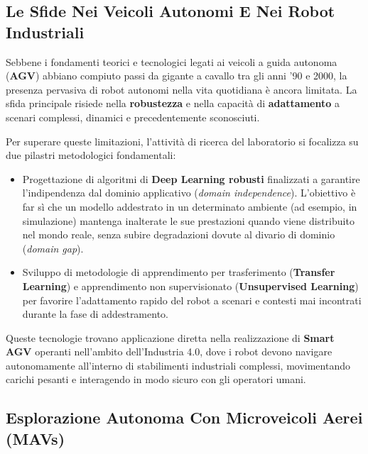﻿\documentclass[11pt, a4paper]{article}
\begin{document}
\subsection{Le Sfide Nei Veicoli Autonomi E Nei Robot Industriali}

Sebbene i fondamenti teorici e tecnologici legati ai veicoli a guida autonoma (\textbf{AGV}) abbiano compiuto passi da gigante a cavallo tra gli anni '90 e 2000, la presenza pervasiva di robot autonomi nella vita quotidiana è ancora limitata. La sfida principale risiede nella \textbf{robustezza} e nella capacità di \textbf{adattamento} a scenari complessi, dinamici e precedentemente sconosciuti.

Per superare queste limitazioni, l'attività di ricerca del laboratorio si focalizza su due pilastri metodologici fondamentali:
\begin{itemize}[noitemsep]
    \item Progettazione di algoritmi di \textbf{Deep Learning robusti} finalizzati a garantire l'indipendenza dal dominio applicativo (\emph{domain independence}). L'obiettivo è far sì che un modello addestrato in un determinato ambiente (ad esempio, in simulazione) mantenga inalterate le sue prestazioni quando viene distribuito nel mondo reale, senza subire degradazioni dovute al divario di dominio (\emph{domain gap}).
    \item Sviluppo di metodologie di apprendimento per trasferimento (\textbf{Transfer Learning}) e apprendimento non supervisionato (\textbf{Unsupervised Learning}) per favorire l'adattamento rapido del robot a scenari e contesti mai incontrati durante la fase di addestramento.
\end{itemize}

Queste tecnologie trovano applicazione diretta nella realizzazione di \textbf{Smart AGV} operanti nell'ambito dell'Industria 4.0, dove i robot devono navigare autonomamente all'interno di stabilimenti industriali complessi, movimentando carichi pesanti e interagendo in modo sicuro con gli operatori umani.


\newpage

\subsection{Esplorazione Autonoma Con Microveicoli Aerei (MAVs)}
\end{document}
